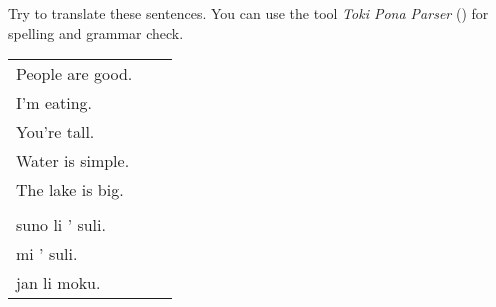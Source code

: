 Try to translate these sentences. 
You can use the tool \textit{Toki Pona Parser} (\cite{www:rowa:02}) for spelling and grammar check. 

\begin{supertabular}{p{5cm}|ll}
People are good. && \\ %
I'm eating. &&  \\ %
You're tall. &&  \\ %
Water is simple. &&  \\ %
The lake is big. &&\\ %
 && \\ %
suno li ' suli. &&  \\%
mi ' suli. &&  \\%
jan li moku. &&  \\%
\end{supertabular} \\%
%
